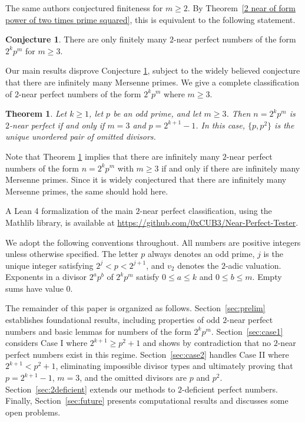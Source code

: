 \documentclass[10pt]{article}
\newtheorem{theorem}{Theorem}
\theoremstyle{definition}
\newtheorem{conjecture}{Conjecture}
\begin{document}
The same authors \cite{AMPSZ} conjectured finiteness for $m\ge2$. By Theorem~\ref{2 near of form power of two times prime squared}, this is equivalent to the following statement.


\begin{conjecture}There are only finitely many $2$-near perfect numbers of the form $2^k p^m$ for $m\geq 3$. \label{conj:finitely_many}
\end{conjecture}
Our main results disprove Conjecture \ref{conj:finitely_many}, subject to the widely believed conjecture that there are infinitely many Mersenne primes. We give a complete classification of $2$-near perfect numbers of the form $2^k p^m$ where $m \geq 3$.

\begin{theorem}\label{full characterization theorem for m>=3}
Let $k\ge1$, let $p$ be an odd prime, and let $m\ge3$. Then
$n=2^kp^m$ is $2$-near perfect if and only if $m=3$ and
$p=2^{k+1}-1$. In this case, $\{p,p^2\}$ is the unique unordered
pair of omitted divisors.
\end{theorem}

Note that Theorem \ref{full characterization theorem for m>=3} implies that there are infinitely many $2$-near perfect numbers of the form $n=2^kp^m$ with $m\ge3$ if and only if there are infinitely many Mersenne primes. Since it is widely conjectured that there are infinitely many Mersenne primes, the same should hold here.

A Lean 4 formalization of the main $2$-near perfect classification, using the Mathlib library, is available at \url{https://github.com/0xCUB3/Near-Perfect-Tester}.


We adopt the following conventions throughout. All numbers are positive integers unless otherwise specified. The letter $p$ always denotes an odd prime, $j$ is the unique integer satisfying $2^j<p<2^{j+1}$, and $v_2$ denotes the $2$-adic valuation. Exponents in a divisor $2^ap^b$ of $2^kp^m$ satisfy $0\le a\le k$ and $0\le b\le m$. Empty sums have value $0$.


The remainder of this paper is organized as follows. Section~\ref{sec:prelim} establishes foundational results, including properties of odd $2$-near perfect numbers and basic lemmas for numbers of the form $2^kp^m$. Section~\ref{sec:case1} considers Case I where $2^{k+1} \geq p^2+1$ and shows by contradiction that no $2$-near perfect numbers exist in this regime. Section~\ref{sec:case2} handles Case II where $2^{k+1} < p^2+1$, eliminating impossible divisor types and ultimately proving that $p = 2^{k+1}-1$, $m=3$, and the omitted divisors are $p$ and $p^2$. Section~\ref{sec:2deficient} extends our methods to $2$-deficient perfect numbers. Finally, Section~\ref{sec:future} presents computational results and discusses some open problems.
\end{document}
